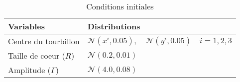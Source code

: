 \begin{table}[htbp]
    \centering
    \caption{Conditions initiales}
    \begin{tabular}[t]{|l|l|}
        \hline
        Variables             & Distributions                                                        \\
        \hline
        Centre du tourbillon  & $\mathcal N(x^i,0.05), \quad \mathcal N(y^i,0.05) \quad i = {1,2,3}$ \\
        Taille de coeur ($R$) & $\mathcal N(0.2, 0.01)$                                              \\
        Amplitude ($\Gamma$)  & $\mathcal N(4.0, 0.08)$                                              \\
        \hline
    \end{tabular}
    \label{tab:init_three_vortex}
\end{table}


